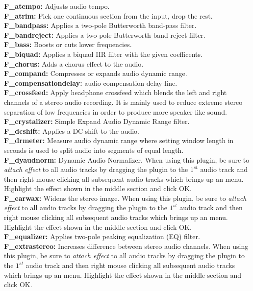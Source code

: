 \textbf{F\_atempo:} Adjusts audio tempo.\\
\textbf{F\_atrim:} Pick one continuous section from the input, drop the rest.\\
\textbf{F\_bandpass:} Applies a two-pole Butterworth band-pass filter.\\
\textbf{F\_bandreject:} Applies a two-pole Butterworth band-reject filter.\\
\textbf{F\_bass:} Boosts or cuts lower frequencies.\\
\textbf{F\_biquad:} Applies a biquad IIR filter with the given coefficents.\\
\textbf{F\_chorus:} Adds a chorus effect to the audio.\\
\textbf{F\_compand:} Compresses or expands audio dynamic range.\\
\textbf{F\_compensationdelay:} audio compensation delay line.\\
\textbf{F\_crossfeed:} Apply headphone crossfeed which blends the left and right channels of a stereo audio recording. It is mainly used to reduce extreme stereo separation of low frequencies in order to produce more speaker like sound.\\
\textbf{F\_crystalizer:} Simple Expand Audio Dynamic Range filter.\\
\textbf{F\_dcshift:} Applies a DC shift to the audio.\\
\textbf{F\_drmeter:} Measure audio dynamic range where setting window length in seconds is used to split audio into segments of equal length.\\
\textbf{F\_dyaudnorm:} Dynamic Audio Normalizer. When using this plugin, be sure to \textit{attach effect} to all audio tracks by dragging the plugin to the $1^{st}$ audio track and then right mouse clicking all subsequent audio tracks which brings up an menu. Highlight the effect shown in the middle section and click OK.\\
\textbf{F\_earwax:} Widens the stereo image. When using this plugin, be sure to \textit{attach effect} to all audio tracks by dragging the plugin to the $1^{st}$ audio track and then right mouse clicking all subsequent audio tracks which brings up an menu. Highlight the effect shown in the middle section and click OK.\\
\textbf{F\_equalizer:} Applies two-pole peaking equalization (EQ) filter.\\
\textbf{F\_extrastereo:} Increases difference between stereo audio channels. When using this plugin, be sure to \textit{attach effect} to all audio tracks by dragging the plugin to the $1^{st}$ audio track and then right mouse clicking all subsequent audio tracks which brings up an menu. Highlight the effect shown in the middle section and click OK.\\
